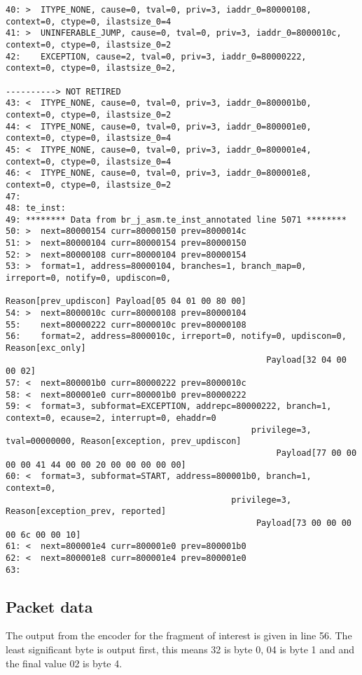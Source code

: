 \begin {lstlisting}[basicstyle=\tiny]
40: >  ITYPE_NONE, cause=0, tval=0, priv=3, iaddr_0=80000108, context=0, ctype=0, ilastsize_0=4
41: >  UNINFERABLE_JUMP, cause=0, tval=0, priv=3, iaddr_0=8000010c, context=0, ctype=0, ilastsize_0=2
42:    EXCEPTION, cause=2, tval=0, priv=3, iaddr_0=80000222, context=0, ctype=0, ilastsize_0=2,
                                                                              ----------> NOT RETIRED
43: <  ITYPE_NONE, cause=0, tval=0, priv=3, iaddr_0=800001b0, context=0, ctype=0, ilastsize_0=2
44: <  ITYPE_NONE, cause=0, tval=0, priv=3, iaddr_0=800001e0, context=0, ctype=0, ilastsize_0=4
45: <  ITYPE_NONE, cause=0, tval=0, priv=3, iaddr_0=800001e4, context=0, ctype=0, ilastsize_0=4
46: <  ITYPE_NONE, cause=0, tval=0, priv=3, iaddr_0=800001e8, context=0, ctype=0, ilastsize_0=2
47:
48: te_inst:
49: ******** Data from br_j_asm.te_inst_annotated line 5071 ********
50: >  next=80000154 curr=80000150 prev=8000014c
51: >  next=80000104 curr=80000154 prev=80000150
52: >  next=80000108 curr=80000104 prev=80000154
53: >  format=1, address=80000104, branches=1, branch_map=0, irreport=0, notify=0, updiscon=0,
                                                  Reason[prev_updiscon] Payload[05 04 01 00 80 00]
54: >  next=8000010c curr=80000108 prev=80000104
55:    next=80000222 curr=8000010c prev=80000108
56:    format=2, address=8000010c, irreport=0, notify=0, updiscon=0, Reason[exc_only]
                                                    Payload[32 04 00 00 02]
57: <  next=800001b0 curr=80000222 prev=8000010c
58: <  next=800001e0 curr=800001b0 prev=80000222
59: <  format=3, subformat=EXCEPTION, addrepc=80000222, branch=1, context=0, ecause=2, interrupt=0, ehaddr=0
                                                 privilege=3, tval=00000000, Reason[exception, prev_updiscon]
                                                      Payload[77 00 00 00 00 41 44 00 00 20 00 00 00 00 00]
60: <  format=3, subformat=START, address=800001b0, branch=1, context=0,
                                             privilege=3, Reason[exception_prev, reported]
                                                  Payload[73 00 00 00 00 6c 00 00 10]
61: <  next=800001e4 curr=800001e0 prev=800001b0
62: <  next=800001e8 curr=800001e4 prev=800001e0
63:
\end{lstlisting}

\subsection{Packet data}

The output from the encoder for the fragment of interest is given in
line 56. The least significant byte is output first, this means 32 is
byte 0, 04 is byte 1 and and the final value 02 is byte 4.

